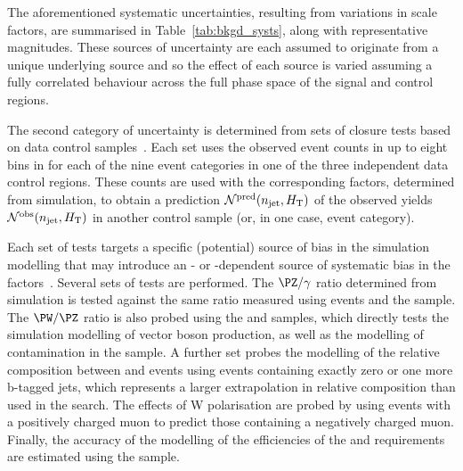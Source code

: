The aforementioned systematic uncertainties, resulting from variations
in scale factors, are summarised in Table~\ref{tab:bkgd_systs}, along
with representative magnitudes. These sources of uncertainty are each
assumed to originate from a unique underlying source and so the effect
of each source is varied assuming a fully correlated behaviour across
the full phase space of the signal and control regions.

The second category of uncertainty is determined from sets of closure
tests based on data control samples~\cite{RA1Paper2012}. Each set uses
the observed event counts in up to eight bins in \scalht for each of
the nine \njet event categories in one of the three independent data
control regions. These counts are used with the corresponding \tf
factors, determined from simulation, to obtain a prediction
$\mathcal{N}^\text{pred}(n_{\text{jet}}, H_{\mathrm{T}})$ of the observed yields
$\mathcal{N}^\text{obs}(n_{\text{jet}}, H_{\mathrm{T}})$ in another control sample
(or, in one case, \nb event category).

Each set of tests targets a specific (potential) source of bias in the
simulation modelling that may introduce an \njet- or \scalht-dependent
source of systematic bias in the \tf factors~\cite{RA1Paper2012}. Several
sets of tests are performed. The $\PZ/\gamma$ ratio determined from
simulation is tested against the same ratio measured using \zmumuj
events and the \gj sample.
The $\PW/\PZ$ ratio is also probed using the \mj and \mmj
samples, which directly tests the simulation modelling of vector
boson production, as well as the modelling of \ttbar contamination in
the \mj sample.
A further set probes the modelling of the relative composition between
\wlj and \ttbar events using \mj events containing exactly zero or one
more b-tagged jets, which represents a larger extrapolation in
relative composition than used in the search.  The effects of W
polarisation are probed by using \mj events with a positively charged
muon to predict those containing a negatively charged muon. Finally,
the accuracy of the modelling of the efficiencies of the \alphat and
\bdphi requirements are estimated using the \mj sample.

